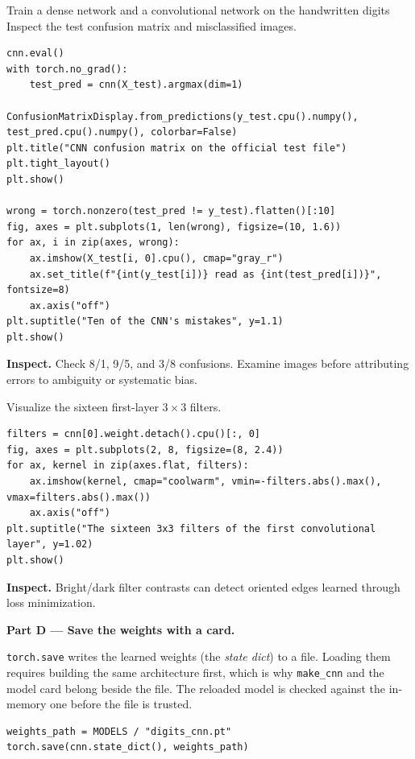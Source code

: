 \begin{labproject}{Train a dense network and a convolutional network on the handwritten digits}
Inspect the test confusion matrix and misclassified images.

\begin{lstlisting}[style=utppython]
cnn.eval()
with torch.no_grad():
    test_pred = cnn(X_test).argmax(dim=1)

ConfusionMatrixDisplay.from_predictions(y_test.cpu().numpy(), test_pred.cpu().numpy(), colorbar=False)
plt.title("CNN confusion matrix on the official test file")
plt.tight_layout()
plt.show()

wrong = torch.nonzero(test_pred != y_test).flatten()[:10]
fig, axes = plt.subplots(1, len(wrong), figsize=(10, 1.6))
for ax, i in zip(axes, wrong):
    ax.imshow(X_test[i, 0].cpu(), cmap="gray_r")
    ax.set_title(f"{int(y_test[i])} read as {int(test_pred[i])}", fontsize=8)
    ax.axis("off")
plt.suptitle("Ten of the CNN's mistakes", y=1.1)
plt.show()
\end{lstlisting}

\textbf{Inspect.} Check 8/1, 9/5, and 3/8 confusions. Examine images before attributing errors to ambiguity or systematic bias.

Visualize the sixteen first-layer $3\times3$ filters.

\begin{lstlisting}[style=utppython]
filters = cnn[0].weight.detach().cpu()[:, 0]
fig, axes = plt.subplots(2, 8, figsize=(8, 2.4))
for ax, kernel in zip(axes.flat, filters):
    ax.imshow(kernel, cmap="coolwarm", vmin=-filters.abs().max(), vmax=filters.abs().max())
    ax.axis("off")
plt.suptitle("The sixteen 3x3 filters of the first convolutional layer", y=1.02)
plt.show()
\end{lstlisting}

\textbf{Inspect.} Bright/dark filter contrasts can detect oriented edges learned through loss minimization.

\medskip\noindent\textbf{Part D --- Save the weights with a card.}\par

\texttt{torch.save} writes the learned weights (the \emph{state dict}) to a file. Loading them requires building the same architecture first, which is why \texttt{make\_cnn} and the model card belong beside the file. The reloaded model is checked against the in-memory one before the file is trusted.

\begin{lstlisting}[style=utppython]
weights_path = MODELS / "digits_cnn.pt"
torch.save(cnn.state_dict(), weights_path)


\end{lstlisting}
\end{labproject}
